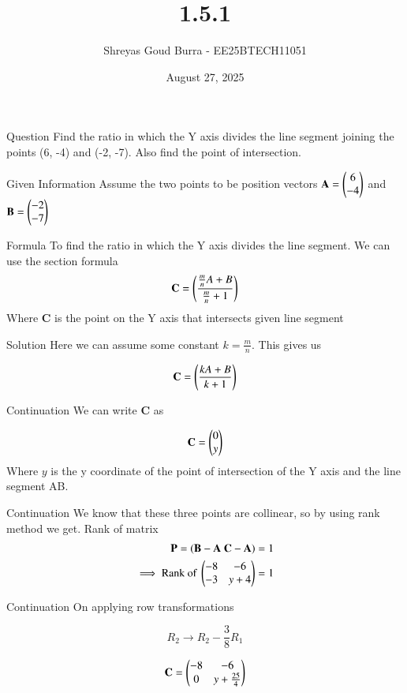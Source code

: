 \documentclass{beamer}
\title %
{1.5.1}
\date{August 27, 2025}
\author 
{Shreyas Goud Burra - EE25BTECH11051}
\begin{document}
\frame{\titlepage}
\begin{frame}{Question}
    Find the ratio in which the Y axis divides the line segment joining the points (6, -4)
and (-2, -7). Also find the point of intersection.

\end{frame}
\begin{frame}{Given Information}
    Assume the two points to be position vectors $\textbf{A} = \myvec{6 \\ -4}$ and $\textbf{B} = \myvec{-2 \\ -7}$
\end{frame}

\begin{frame}{Formula}
To find the ratio in which the Y axis divides the line segment. We can use the section formula\\
    \begin{align}
        \textbf{C} = \brak{\frac{\frac{m}{n}A+B}{\frac{m}{n}+1}}
        \label{0.1}
    \end{align}
Where \textbf{C} is the point on the Y axis that intersects given line segment
\end{frame}
\begin{frame}{Solution}
    Here we can assume some constant $k=\frac{m}{n}$. This gives us

\begin{align}
    \textbf{C} = \brak{\frac{kA+B}{k+1}}
    \label{0.2}
\end{align}
\end{frame}
\begin{frame}{Continuation}
    We can write \textbf{C} as 
    
    \begin{align}
        \mathbf{C} = \myvec{0 \\ y}
        \label{0.3}
    \end{align}
    Where $y$ is the y coordinate of the point of intersection of the Y axis and the line segment AB.
\end{frame}

\begin{frame}{Continuation}
We know that these three points are collinear, so by using rank method we get. Rank of matrix 
\begin{align}
    \textbf{P} = (\textbf{B}-\textbf{A} \text{ } \textbf{C}-\textbf{A}) = 1 \\
    \implies \text{Rank of } \myvec{-8 & -6 \\ -3 & y+4} = 1
    \label{0.4}
\end{align}
\end{frame}
\begin{frame}{Continuation}
On applying row transformations

$$ R_2 \rightarrow R_2 - \frac{3}{8}R_1$$

\begin{align}
    \textbf{C} = \myvec{-8 & -6 \\ 0 & y+\frac{25}{4}}\\
\end{align}
\end{frame}
\end{document}
